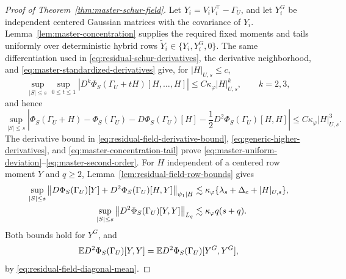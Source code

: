 \begin{proof}[Proof of Theorem~\ref{thm:master-schur-field}]
Let $Y_i=V_iV_i^\top-\Gamma_U$, and let $Y_i^G$ be independent centered
Gaussian matrices with the covariance of $Y_i$.
Lemma~\ref{lem:master-concentration} supplies the required fixed moments
and tails uniformly over deterministic hybrid rows
$\widetilde Y_i\in\{Y_i,Y_i^G,0\}$.
The same differentiation used in
\eqref{eq:residual-schur-derivatives}, the derivative neighborhood, and
\eqref{eq:master-standardized-derivatives} give, for
$|H|_{U,s}\le c$,
\begin{equation}\label{eq:generic-higher-derivatives}
 \sup_{|S|\le s}\sup_{0\le t\le1}
 \left|D^k\Phi_S(\Gamma_U+tH)[H,\ldots,H]\right|
 \le C\kappa_\varphi|H|_{U,s}^k,
 \qquad k=2,3,
\end{equation}
and hence
\begin{equation}\label{eq:generic-taylor-remainder}
 \sup_{|S|\le s}\left|
 \Phi_S(\Gamma_U+H)-\Phi_S(\Gamma_U)-D\Phi_S(\Gamma_U)[H]
 -\frac12D^2\Phi_S(\Gamma_U)[H,H]
 \right|\le C\kappa_\varphi|H|_{U,s}^3.
\end{equation}
The derivative bound in
\eqref{eq:residual-field-derivative-bound},
\eqref{eq:generic-higher-derivatives}, and
\eqref{eq:master-concentration-tail} prove
\eqref{eq:master-uniform-deviation}--\eqref{eq:master-second-order}.
For $H$ independent of a centered
row moment $Y$ and $q\ge2$, Lemma~\ref{lem:residual-field-row-bounds}
gives
\begin{align}
 \sup_{|S|\le s}
 \left\lVert D\Phi_S(\Gamma_U)[Y]+D^2\Phi_S(\Gamma_U)[H,Y]\right\rVert_{\psi_1\mid H}
 &\lesssim\kappa_\varphi
 \{\lambda_s+\Delta_c+|H|_{U,s}\},
 \label{eq:generic-linear-row-bound}\\
 \sup_{|S|\le s}
 \left\lVert D^2\Phi_S(\Gamma_U)[Y,Y]\right\rVert_{L_q}
 &\lesssim\kappa_\varphi q(s+q).
 \label{eq:generic-diagonal-row-bound}
\end{align}
Both bounds hold for $Y^G$, and
\begin{equation}\label{eq:generic-diagonal-mean-matching}
        \mathbb E D^2\Phi_S(\Gamma_U)[Y,Y]
        =\mathbb E D^2\Phi_S(\Gamma_U)[Y^G,Y^G],
\end{equation}
by \eqref{eq:residual-field-diagonal-mean}.


\end{proof}
